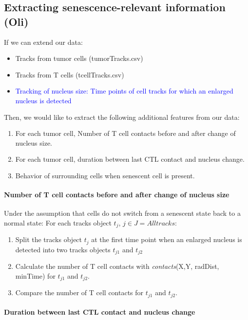 \documentclass{report}
\begin{document}
\subsection{Extracting senescence-relevant information (Oli)}

If we can extend our data:
\begin{itemize}
	\item Tracks from tumor cells (tumorTracks.csv)
	\item Tracks from T cells (tcellTracks.csv)
	\item \textcolor{blue}{Tracking of nucleus size: Time points of cell tracks for which an enlarged nucleus is detected}
\end{itemize}

Then, we would like to extract the following additional features from our data:

\begin{enumerate}
	\item For each tumor cell, Number of T cell contacts before and after change of nucleus size. 
	\item For each tumor cell, duration between last CTL contact and nucleus change.
	\item Behavior of surrounding cells when senescent cell is present.
\end{enumerate}

\paragraph{Number of T cell contacts before and after change of nucleus size}

Under the assumption that cells do not switch from a senescent state back to a normal state: For each tracks object $t_j$, $j\in J = {All tracks}$:

\begin{enumerate}
 \item Split the tracks object $t_j$ at the first time point when an enlarged nucleus is detected into two tracks objects $t_{j1}$ and $t_{j2}$
 \item Calculate the number of T cell contacts with \textit{contacts}(X,Y, radDist, minTime) for $t_{j1}$ and $t_{j2}$.
 \item Compare the number of T cell contacts for $t_{j1}$ and $t_{j2}$.
\end{enumerate}

\paragraph{Duration between last CTL contact and nucleus change}
\end{document}
